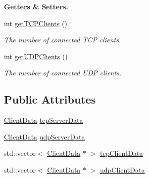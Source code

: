 \begin{Indent}{\bf Getters \& Setters.}
\begin{DoxyCompactItemize}
int \hyperlink{classNetManager_a2488915365f983bafc310a13987bc0b1}{get\-T\-C\-P\-Clients} ()
\begin{DoxyCompactList}\small\item\em The number of connected T\-C\-P clients. \end{DoxyCompactList}\item 
int \hyperlink{classNetManager_a785826341013e957efbff6d6581c6d56}{get\-U\-D\-P\-Clients} ()
\begin{DoxyCompactList}\small\item\em The number of connected U\-D\-P clients. \end{DoxyCompactList}\end{DoxyCompactItemize}
\end{Indent}
\subsection*{Public Attributes}
\begin{DoxyCompactItemize}
\item 
\hyperlink{structClientData}{Client\-Data} \hyperlink{classNetManager_abca113fc17fe6251fa7ac5a1179ade3c}{tcp\-Server\-Data}
\item 
\hyperlink{structClientData}{Client\-Data} \hyperlink{classNetManager_a7db7fafed8aabbe088aa12c731842efd}{udp\-Server\-Data}
\item 
std\-::vector$<$ \hyperlink{structClientData}{Client\-Data} $\ast$ $>$ \hyperlink{classNetManager_a3303746abef87426cab748c92d58006b}{tcp\-Client\-Data}
\item 
std\-::vector$<$ \hyperlink{structClientData}{Client\-Data} $\ast$ $>$ \hyperlink{classNetManager_a687d70a4e199c2cbe4cb955a2cd94b04}{udp\-Client\-Data}
\end{DoxyCompactItemize}
